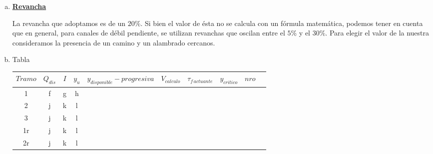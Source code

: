 \documentclass[10.5pt]{article}
\begin{document}
\begin{enumerate}[a)]
 
 
 \item \underline{\bf Revancha}
   
  La revancha que adoptamos es de un $20\%$. Si bien el valor de ésta no se calcula con un fórmula matemática, podemos tener en cuenta que 
  en general, para canales de débil pendiente, se utilizan revanchas que oscilan entre el $5\%$ y el $30\%$. Para elegir el valor de la nuestra
  consideramos la presencia de un camino y un alambrado cercanos.
  
  \item Tabla
  
   \begin{table}[H]
    \large        %
    \centering    %
    \begin{tabular}{|c|c|c|c|c|c|c|c|c|c|}
    \hline
    $Tramo$  &$Q_{dis}$  &$I$  &$y_{u}$  &$y_{disponible} - progresiva$  &$V_{calculo}$  &$\tau_{f\,actuante}$  &$y_{critico}$  &$nro$\\     %
    \hline
    1&f&g&h\\
    \hline
    2&j&k&l\\
    \hline
    3&j&k&l\\
    \hline
    1r&j&k&l\\
    \hline
    2r&j&k&l\\
    \hline        %
    \end{tabular}
  \end{table}

\end{enumerate}


























 
\end{document}
